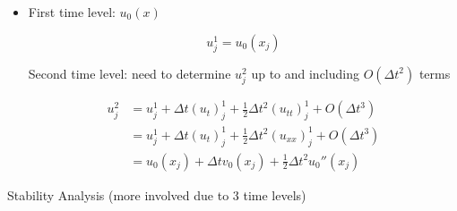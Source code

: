 \begin{itemize}
    \item First time level: $u_0(x)$

    \[ u_j^1 = u_0(x_j)\]

    Second time level: need to determine $u_j^2$ up to and including $O(\Delta t^2)$ terms

    \begin{align}
        u_j^2 &= u_j^1 + \Delta t (u_t)_j^1 + \frac{1}{2} \Delta t^2 (u_{tt})_j^1 + O(\Delta t^3) \\
        &= u_j^1 + \Delta t (u_t)_j^1 + \frac{1}{2} \Delta t^2 (u_{xx})_j^1 + O(\Delta t^3)\\
        &= u_0(x_j) + \Delta t v_0(x_j) + \frac{1}{2} \Delta t^2 u_0''(x_j)
    \end{align}
\end{itemize}

Stability Analysis 
(more involved due to 3 time levels)

